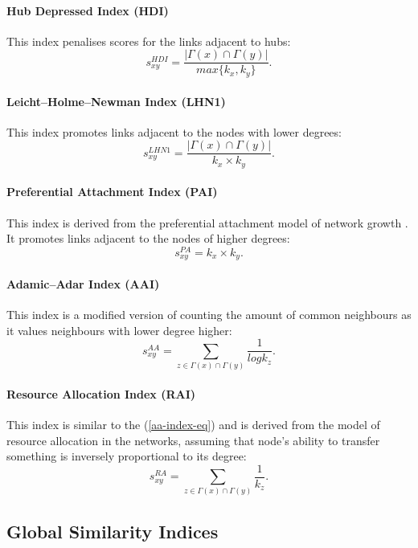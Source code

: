 \documentclass{llncs}
\begin{document}
\paragraph{Hub Depressed Index (HDI)}
%
This index penalises scores for the links adjacent to hubs:
\begin{equation}
s_{xy}^{HDI} = \frac{|\Gamma(x) \cap \Gamma(y)|}{max\{k_x, k_y\}}.
\end{equation}
%
\paragraph{Leicht–Holme–Newman Index (LHN1) \cite{lhn1-index}}
%
This index promotes links adjacent to the nodes with lower degrees:
\begin{equation}
s_{xy}^{LHN1} = \frac{|\Gamma(x) \cap \Gamma(y)|}{k_x \times k_y}.
\end{equation}
%
\paragraph{Preferential Attachment Index (PAI)}
%
This index is derived from the preferential attachment model of network growth \cite{netw-growth}. It promotes links adjacent to the nodes of higher degrees:
\begin{equation}
s_{xy}^{PA} = k_x \times k_y.
\end{equation}
%
\paragraph{Adamic–Adar Index (AAI) \cite{aa-index}}
%
This index is a modified version of counting the amount of common neighbours as it values neighbours with lower degree higher:
\begin{equation}
s_{xy}^{AA} = \sum_{z \in \Gamma(x) \cap \Gamma(y)} \frac{1}{log k_z}.
\label{aa-index-eq}
\end{equation}
%
\paragraph{Resource Allocation Index (RAI) \cite{rai-index}}
%
This index is similar to the (\ref{aa-index-eq}) and is derived from the model of resource allocation in the networks, assuming that node's ability to transfer something is inversely proportional to its degree:
\begin{equation}
s_{xy}^{RA} = \sum_{z \in \Gamma(x) \cap \Gamma(y)} \frac{1}{k_z}.
\end{equation}
%
\subsection{Global Similarity Indices}
%
\end{document}

